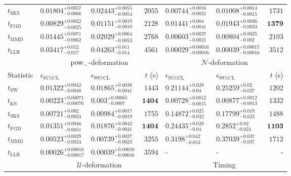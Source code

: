 \begin{tabular}{l|llr|llr}
	$t_{\mathrm{SKS}}$ & $0.01804_{-0.0066}^{+0.0057}$ & $0.02443_{-0.0054}^{+0.0055}$ & $2055$ & $0.00744_{-0.0021}^{+0.0016}$ & $0.01008_{-0.0015}^{+0.0014}$ & $1731$ \\
	$t_{\mathrm{FGD}}$ & ${\mathbf{0.00829_{-0.0025}^{+0.0022}}}$ & ${\mathbf{0.01151_{-0.0019}^{+0.0019}}}$ & $2128$ & $0.01441_{-0.0041}^{+0.004}$ & $0.01943_{-0.0033}^{+0.0036}$ & ${\mathbf{1379}}$ \\
	$t_{\mathrm{MMD}}$ & $0.01445_{-0.0062}^{+0.0071}$ & $0.02029_{-0.0053}^{+0.0064}$ & $2768$ & $0.00603_{-0.0021}^{+0.0027}$ & $0.00804_{-0.002}^{+0.0025}$ & $2103$ \\
	$t_{\mathrm{LLR}}$ & $0.03417_{-0.017}^{+0.012}$ & $0.04263_{-0.014}^{+0.011}$ & $4561$ & $0.00029_{-0.00016}^{+0.00016}$ & $0.00039_{-0.00016}^{+0.00017}$ & $3512$ \\
	\toprule
	\multicolumn{1}{c}{} & \multicolumn{3}{c}{$\rm{pow}_{-}$-deformation} & \multicolumn{3}{c}{$\mathcal{N}$-deformation} \\
	Statistic & $\epsilon_{95\%\mathrm{CL}}$ & $\epsilon_{99\%\mathrm{CL}}$ & $t$ (s) & $\epsilon_{95\%\mathrm{CL}}$ & $\epsilon_{99\%\mathrm{CL}}$ & $t$ (s) \\
	\midrule
	$t_{\mathrm{SW}}$ & $0.01322_{-0.0048}^{+0.0042}$ & $0.01865_{-0.0041}^{+0.0038}$ & $1443$ & $0.21144_{-0.04}^{+0.028}$ & $0.25259_{-0.027}^{+0.02}$ & $1202$ \\
	$t_{\overline{\mathrm{KS}}}$ & ${\mathbf{0.00223_{-0.00076}^{+0.00071}}}$ & ${\mathbf{0.003_{-0.0007}^{+0.00065}}}$ & ${\mathbf{1404}}$ & ${\mathbf{0.00728_{-0.0015}^{+0.0012}}}$ & ${\mathbf{0.00877_{-0.0013}^{+0.0012}}}$ & $1332$ \\
	$t_{\mathrm{SKS}}$ & $0.00721_{-0.0024}^{+0.002}$ & $0.00984_{-0.0019}^{+0.0017}$ & $1755$ & $0.14872_{-0.032}^{+0.025}$ & $0.17799_{-0.023}^{+0.019}$ & $1488$ \\
	$t_{\mathrm{FGD}}$ & $0.01351_{-0.0051}^{+0.0046}$ & $0.01876_{-0.0041}^{+0.0042}$ & ${\mathbf{1404}}$ & $0.24435_{-0.04}^{+0.028}$ & $0.2852_{-0.024}^{+0.02}$ & ${\mathbf{1103}}$ \\
	$t_{\mathrm{MMD}}$ & $0.00523_{-0.0024}^{+0.0029}$ & $0.00739_{-0.0023}^{+0.0027}$ & $3255$ & $0.3198_{-0.053}^{+0.042}$ & $0.37039_{-0.037}^{+0.037}$ & $1712$ \\
	$t_{\mathrm{LLR}}$ & $0.00026_{-0.00017}^{+0.00016}$ & $0.00039_{-0.00016}^{+0.00016}$ & $3594$ & - & - & - \\
	\toprule
	\multicolumn{1}{c}{} & \multicolumn{3}{c}{$\mathcal{U}$-deformation} & \multicolumn{3}{c}{Timing} \\

\end{tabular}
